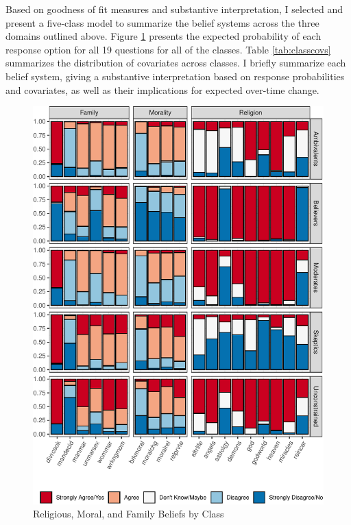 \documentclass[12pt,]{article}
\begin{document}
Based on goodness of fit measures and substantive interpretation, I selected and present a five-class model to summarize the belief systems across the three domains outlined above. Figure \ref{fig:beliefsystems} presents the expected probability of each response option for all 19 questions for all of the classes. Table \ref{tab:classcovs} summarizes the distribution of covariates across classes. I briefly summarize each belief system, giving a substantive interpretation based on response probabilities and covariates, as well as their implications for expected over-time change.

\begin{figure}

{\centering \includegraphics{rethinking_constraint_revision_files/figure-latex/beliefsystems-1} 

}

\caption{Religious, Moral, and Family Beliefs by Class}\label{fig:beliefsystems}
\end{figure}
\end{document}
